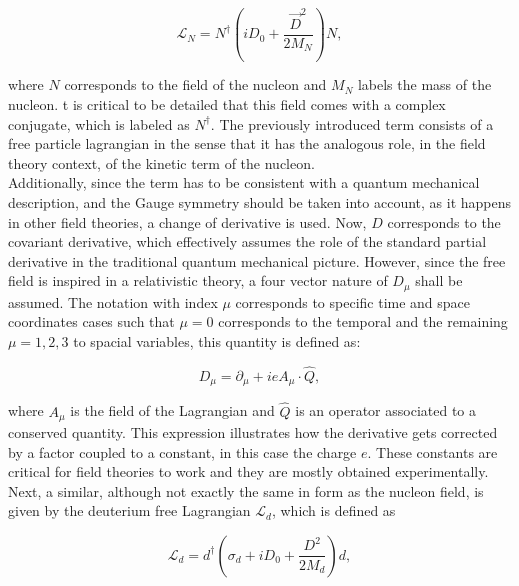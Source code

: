 \documentclass[openany]{book}
\begin{document}
\begin{equation}\label{eq:micro_EFT_lagrangian_N}
	 \mathcal{L}_N  = N^{\dagger} \left(i D_0 + \frac{\vec D^2}{2M_N} \right) N,
\end{equation}

where $N$ corresponds to the field of the nucleon and $M_N$ labels the mass of the nucleon.  t is critical to be detailed that this field comes with a complex conjugate, which is labeled as $N^{\dagger}$. The previously introduced term consists of a free particle lagrangian in the sense that it has the analogous role, in the field theory context, of the kinetic term of the nucleon. \\

Additionally, since the term has to be consistent with a quantum mechanical description, and the Gauge symmetry should be taken into account, as it happens in other field theories, a change of derivative is used. Now, $D$ corresponds to the covariant derivative, which effectively assumes the role of the standard partial derivative in the traditional quantum mechanical picture. However, since the free field is inspired in a relativistic theory, a four vector nature of $D_\mu$ shall be assumed. The notation with index $\mu$ corresponds to specific time and space coordinates cases such that  $\mu = 0$  corresponds to the temporal and the remaining $\mu = 1, 2, 3$ to spacial variables,  this quantity is defined as:

\begin{equation}\label{eq:micro_EFT_covariantDerivative}
	D_\mu = \partial_\mu  + i e A_\mu \cdot \hat Q,
\end{equation}

where $A_\mu$ is the field of the Lagrangian and $\hat Q$ is an operator associated to a conserved quantity. This expression illustrates how the derivative gets corrected by a factor coupled to a constant, in this case the charge $e$. These constants are critical for field theories to work and they are mostly obtained experimentally. \\

Next, a similar, although not exactly the same in form as the nucleon field, is given by the deuterium free Lagrangian $\mathcal{L}_d$, which is defined as

\begin{equation}\label{eq:micro_EFT_lagrangian_d}
	\mathcal{L}_d  = d^{\dagger} \left( \sigma_d + i D_0 + \frac{D^2}{2M_d} \right) d,
\end{equation}
\end{document}
